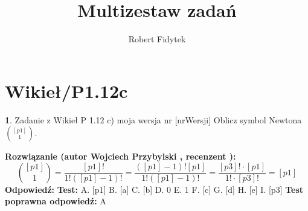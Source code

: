 \documentclass[12pt, a4paper]{article}
\title{Multizestaw zadań}
\author{Robert Fidytek}
\date{}
\theoremstyle{definition} %
\newtheorem{zad}{}
\newcommand{\kategoria}[1]{\section{#1}} %
\newcommand{\zadStart}[1]{\begin{zad}#1\newline} %
\newcommand{\zadStop}{\end{zad}}   %
\newcommand{\rozwStart}[2]{\noindent \textbf{Rozwiązanie (autor #1 , recenzent #2): }\newline} %
\newcommand{\rozwStop}{\newline}                                            %
\newcommand{\odpStart}{\noindent \textbf{Odpowiedź:}\newline}    %
\newcommand{\odpStop}{\newline}                                             %
\newcommand{\testStart}{\noindent \textbf{Test:}\newline} %
\newcommand{\testStop}{\newline} %
\newcommand{\kluczStart}{\noindent \textbf{Test poprawna odpowiedź:}\newline} %
\newcommand{\kluczStop}{\newline} %
\begin{document}
\maketitle


\kategoria{Wikieł/P1.12c}
\zadStart{Zadanie z Wikieł P 1.12 c) moja wersja nr [nrWersji]}
Oblicz symbol Newtona ${[p1]\choose1} $.
\zadStop
\rozwStart{Wojciech Przybylski}{}
$${[p1]\choose1}=\frac{[p1]!}{1!([p1]-1)!}=\frac{([p1]-1)![p1]}{1!([p1]-1)!}=\frac{[p3]!\cdot[p1]}{1!\cdot[p3]!}=[p1]$$
\rozwStop
\odpStart
[p1]
\odpStop
\testStart
A. [p1]
B. [a]
C. [b]
D. 0
E. 1
F. [c]
G. [d]
H. [e]
I. [p3]
\testStop
\kluczStart
A
\kluczStop
\end{document}
